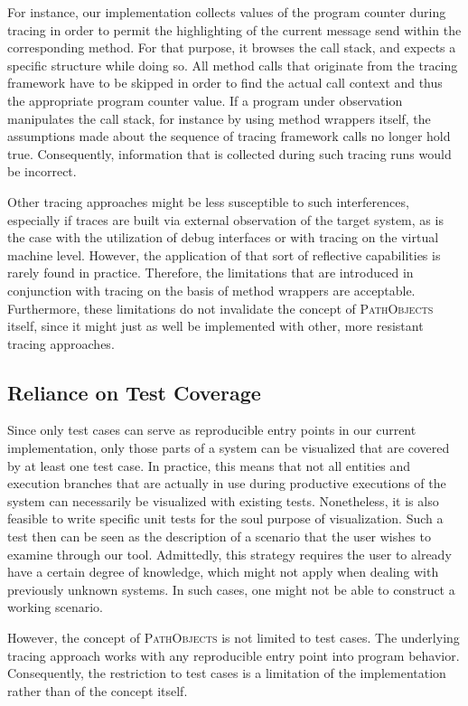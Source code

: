 For instance, our implementation collects values of the program counter during tracing in order to permit the highlighting of the current message send within the corresponding method.
For that purpose, it browses the call stack, and expects a specific structure while doing so.
All method calls that originate from the tracing framework have to be skipped in order to find the actual call context and thus the appropriate program counter value.
If a program under observation manipulates the call stack, for instance by using method wrappers itself, the assumptions made about the sequence of tracing framework calls no longer hold true.
Consequently, information that is collected during such tracing runs would be incorrect.

Other tracing approaches might be less susceptible to such interferences, especially if traces are built via external observation of the target system, as is the case with the utilization of debug interfaces or with tracing on the virtual machine level.
However, the application of that sort of reflective capabilities is rarely found in practice.
Therefore, the limitations that are introduced in conjunction with tracing on the basis of method wrappers are acceptable.
Furthermore, these limitations do not invalidate the concept of \textsc{PathObjects} itself, since it might just as well be implemented with other, more resistant tracing approaches.

\subsection{Reliance on Test Coverage}
\label{ss:DiscussionLimitationsCoverage}
Since only test cases can serve as reproducible entry points in our current implementation, only those parts of a system can be visualized that are covered by at least one test case.
In practice, this means that not all entities and execution branches that are actually in use during productive executions of the system can necessarily be visualized with existing tests.
Nonetheless, it is also feasible to write specific unit tests for the soul purpose of visualization.
Such a test then can be seen as the description of a scenario that the user wishes to examine through our tool.
Admittedly, this strategy requires the user to already have a certain degree of knowledge, which might not apply when dealing with previously unknown systems.
In such cases, one might not be able to construct a working scenario.

However, the concept of \textsc{PathObjects} is not limited to test cases.
The underlying tracing approach works with any reproducible entry point into program behavior.
Consequently, the restriction to test cases is a limitation of the implementation rather than of the concept itself.

